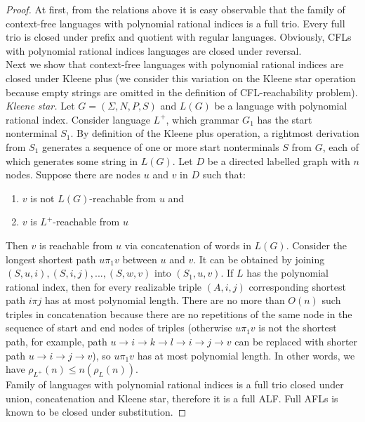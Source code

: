 \begin{proof}

At first, from the relations above it is easy observable that the family of context-free languages with polynomial rational indices is a full trio. Every full trio is closed under prefix and quotient with regular languages. Obviously, CFLs with polynomial rational indices languages are closed under reversal. 
\\
Next we show that context-free languages with polynomial rational indices are closed under Kleene plus (we consider this variation on the Kleene star operation because empty strings are omitted in the definition of CFL-reachability problem).
\\ 
\textit{Kleene star.} Let $G = (\Sigma, N, P, S)$ and $L(G)$ be a language with polynomial rational index. Consider language $L^{+}$, which grammar $G_1$ has the start nonterminal $S_1$. By definition of the Kleene plus operation, a rightmost derivation from $S_1$ generates a sequence of one or more start nonterminals $S$ from $G$, each of which generates some string in $L(G)$. Let $D$ be a directed labelled graph with $n$ nodes. Suppose there are nodes $u$ and $v$ in $D$ such that:
\begin{enumerate}
\item $v$ is not $L(G)$-reachable from $u$ and
\item $v$ is  $L^+$-reachable from $u$
\end{enumerate}
Then $v$ is reachable from $u$ via concatenation of words in $L(G)$. Consider the longest shortest path $u\pi_1 v$ between $u$ and $v$. It can be obtained by joining $(S, u, i), (S, i, j), ..., (S, w, v)$ into $(S_1, u, v)$.  If $L$ has the polynomial rational index, then for every realizable triple $(A, i, j)$ corresponding shortest path $i \pi j$ has at most polynomial length. There are no more than $O(n)$ such triples in concatenation because there are no repetitions of the same node in the sequence of start and end nodes of triples (otherwise $u\pi_1 v$ is not the shortest path, for example, path $u \rightarrow i \rightarrow k \rightarrow l \rightarrow i \rightarrow j \rightarrow v$ can be replaced with shorter path $u \rightarrow i  \rightarrow j \rightarrow v$), so $u\pi_1 v$ has at most polynomial length. In other words, we have $\rho_{L^+}(n) \le n(\rho_L(n))$.
\\
Family of languages with polynomial rational indices is a full trio closed under union, concatenation and Kleene star, therefore it is a full ALF. Full AFLs is known to be closed under substitution.

\end{proof}
